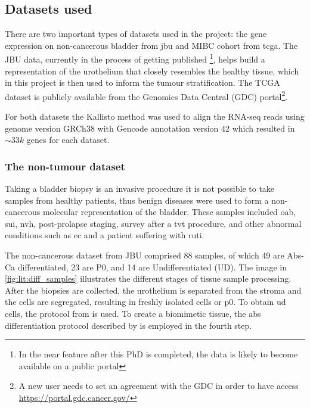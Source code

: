 \subsection{Datasets used} \label{s:lit:datasets_used}

There are two important types of datasets used in the project: the gene expression on non-cancerous bladder from \acrfull{jbu} and MIBC cohort from \acrfull{tcga}. The JBU data, currently in the process of getting published \footnote{In the near feature after this PhD is completed, the data is likely to become available on a public portal}, helps build a representation of the urothelium that closely resembles the healthy tissue, which in this project is then used to inform the tumour stratification. The TCGA dataset is publicly available from the Genomics Data Central (GDC) portal\footnote{A new user needs to set an agreement with the GDC in order to have access \url{https://portal.gdc.cancer.gov/}}.


For both datasets the Kallisto method was used to align the RNA-seq reads using genome version GRCh38 with Gencode annotation version 42 which resulted in $\sim33k$ genes for each dataset.



\subsubsection*{The non-tumour dataset} \label{s:lit:non_tum_data}

Taking a bladder biopsy is an invasive procedure it is not possible to take samples from healthy patients, thus benign diseases were used to form a non-cancerous molecular representation of the bladder. These samples included \acrfull{oab}, \acrfull{sui}, \acrfull{nvh}, post-prolapse staging, survey after a \acrfull{tvt} procedure, and other abnormal conditions such as \acrfull{cc} and a patient suffering with \acrfull{ruti}.

The non-cancerous dataset from JBU comprised 88 samples, of which 49 are Abs-Ca differentiated, 23 are P0, and 14 are Undifferentiated (UD). The image in \cref{fig:lit:diff_samples} illustrates the different stages of tissue sample processing. After the biopsies are collected, the urothelium is separated from the stroma and the cells are segregated, resulting in freshly isolated cells or \acrshort{p0}. To obtain \acrfull{ud} cells, the protocol from \citet{Cross2005-fe} is used. To create a biomimetic tissue, the \acrshort{abs} differentiation protocol described by \citet{Cross2005-fe} is employed in the fourth step.

